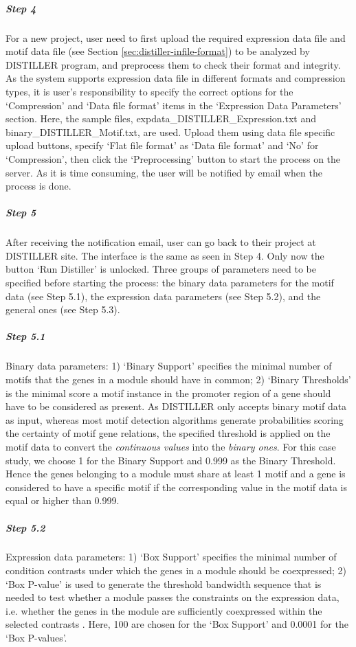 \begin{small} %
\subparagraph{Step 4} For a new project, user need to first upload the required expression data file and motif data file (see Section \ref{sec:distiller-infile-format}) to be analyzed by DISTILLER program, and preprocess them to check their format and integrity.  As the system supports expression data file in different formats and compression types, it is user's responsibility to specify the correct options for the `Compression' and `Data file format' items in the `Expression Data Parameters' section. Here, the sample files, expdata\_DISTILLER\_Expression.txt and binary\_DISTILLER\_Motif.txt, are used.  Upload them using data file specific upload buttons, specify `Flat file format' as `Data file format' and `No' for `Compression', then click the `Preprocessing' button to start the process on the server. As it is time consuming, the user will be notified by email when the process is done.


\subparagraph{Step 5} After receiving the notification email, user can go back to their project at DISTILLER site.  The interface is the same as seen in Step 4. Only now the button `Run Distiller' is unlocked.  Three groups of parameters need to be specified before starting the process: the binary data parameters for the motif data (see Step 5.1), the expression data parameters (see Step 5.2), and the general ones (see Step 5.3).

\subparagraph{Step 5.1} Binary data parameters: 1) `Binary Support' specifies the minimal number of motifs that the genes in a module should have in common; 2) `Binary Thresholds' is the minimal score a motif instance in the promoter region of a gene should have to be considered as present.   As DISTILLER only accepts binary motif data as input, whereas most motif detection algorithms generate probabilities scoring the certainty of motif gene relations, the specified threshold is applied on the motif data to convert the \textit{continuous values} into the \textit{binary ones}. For this case study, we choose 1 for the Binary Support and  0.999 as the Binary Threshold. Hence the genes belonging to a module must share  at least 1 motif and a gene is considered to have a specific motif if the  corresponding value in the motif data is equal or higher than 0.999.

\subparagraph{Step 5.2}	Expression data parameters: 1) `Box Support' specifies the minimal number of condition contrasts under which the genes in a module should be coexpressed; 2) `Box P-value' is used to generate the threshold bandwidth sequence that is needed to test whether a module passes the constraints on the expression data, i.e. whether the genes in the module are sufficiently coexpressed within the selected contrasts \cite{Lemmens2009}. Here, 100 are chosen for the `Box Support' and 0.0001 for the `Box P-values'.


\end{small}

